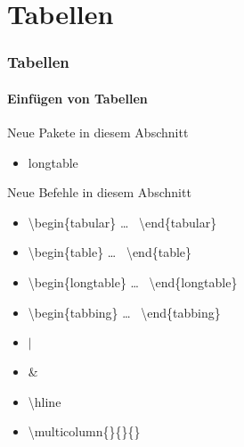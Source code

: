 \section{Tabellen}

\begin{frame}
\frametitle{Tabellen}
\framesubtitle{Einf\"ugen von Tabellen}

\begin{exampleblock}{Neue Pakete in diesem Abschnitt}
\begin{itemize}
\item longtable
\end{itemize}
\end{exampleblock}

\begin{block}{Neue Befehle in diesem Abschnitt}
\begin{itemize}
\item \color{unibablueI}\textbackslash begin\color{black}\{tabular\} \dots
~\color{unibablueI}\textbackslash end\color{black}\{tabular\}
\item \color{unibablueI}\textbackslash begin\color{black}\{table\} \dots
~\color{unibablueI}\textbackslash end\color{black}\{table\}
\item \color{unibablueI}\textbackslash begin\color{black}\{longtable\} \dots
~\color{unibablueI}\textbackslash end\color{black}\{longtable\}
\item \color{unibablueI}\textbackslash begin\color{black}\{tabbing\} \dots
~\color{unibablueI}\textbackslash end\color{black}\{tabbing\}
\item \color{nounibaredI}$|$\color{black}
\item \color{nounibaredI}\& \color{black}
\item \color{nounibaredI}\textbackslash hline\color{black}
\item \color{nounibaredI}\textbackslash multicolumn\color{black}\{\}\{\}\{\}
\end{itemize}
\end{block}

\end{frame}


